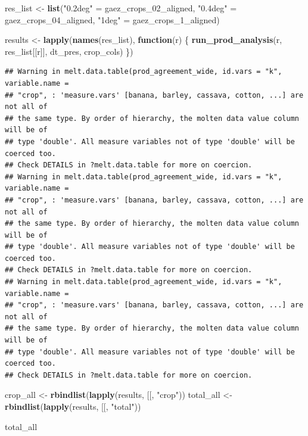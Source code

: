 \documentclass[
  11pt,
]{article}
\newenvironment{Shaded}{\begin{snugshade}}{\end{snugshade}}
\newcommand{\AttributeTok}[1]{\textcolor[rgb]{0.13,0.29,0.53}{#1}}
\newcommand{\ControlFlowTok}[1]{\textcolor[rgb]{0.13,0.29,0.53}{\textbf{#1}}}
\newcommand{\FunctionTok}[1]{\textcolor[rgb]{0.13,0.29,0.53}{\textbf{#1}}}
\newcommand{\NormalTok}[1]{#1}
\newcommand{\OtherTok}[1]{\textcolor[rgb]{0.56,0.35,0.01}{#1}}
\newcommand{\StringTok}[1]{\textcolor[rgb]{0.31,0.60,0.02}{#1}}
\begin{document}
\begin{Shaded}
\begin{Highlighting}[]
\NormalTok{res\_list }\OtherTok{\textless{}{-}} \FunctionTok{list}\NormalTok{(}\StringTok{"0.2deg"} \OtherTok{=}\NormalTok{ gaez\_crops\_02\_aligned,}
                 \StringTok{"0.4deg"} \OtherTok{=}\NormalTok{ gaez\_crops\_04\_aligned,}
                 \StringTok{"1deg"}   \OtherTok{=}\NormalTok{ gaez\_crops\_1\_aligned)}

\NormalTok{results }\OtherTok{\textless{}{-}} \FunctionTok{lapply}\NormalTok{(}\FunctionTok{names}\NormalTok{(res\_list), }\ControlFlowTok{function}\NormalTok{(r) \{}
  \FunctionTok{run\_prod\_analysis}\NormalTok{(r, res\_list[[r]], dt\_pres, crop\_cols)}
\NormalTok{\})}
\end{Highlighting}
\end{Shaded}

\begin{verbatim}
## Warning in melt.data.table(prod_agreement_wide, id.vars = "k", variable.name =
## "crop", : 'measure.vars' [banana, barley, cassava, cotton, ...] are not all of
## the same type. By order of hierarchy, the molten data value column will be of
## type 'double'. All measure variables not of type 'double' will be coerced too.
## Check DETAILS in ?melt.data.table for more on coercion.
## Warning in melt.data.table(prod_agreement_wide, id.vars = "k", variable.name =
## "crop", : 'measure.vars' [banana, barley, cassava, cotton, ...] are not all of
## the same type. By order of hierarchy, the molten data value column will be of
## type 'double'. All measure variables not of type 'double' will be coerced too.
## Check DETAILS in ?melt.data.table for more on coercion.
## Warning in melt.data.table(prod_agreement_wide, id.vars = "k", variable.name =
## "crop", : 'measure.vars' [banana, barley, cassava, cotton, ...] are not all of
## the same type. By order of hierarchy, the molten data value column will be of
## type 'double'. All measure variables not of type 'double' will be coerced too.
## Check DETAILS in ?melt.data.table for more on coercion.
\end{verbatim}

\begin{Shaded}
\begin{Highlighting}[]
\NormalTok{crop\_all  }\OtherTok{\textless{}{-}} \FunctionTok{rbindlist}\NormalTok{(}\FunctionTok{lapply}\NormalTok{(results, }\StringTok{\textasciigrave{}}\AttributeTok{[[}\StringTok{\textasciigrave{}}\NormalTok{, }\StringTok{"crop"}\NormalTok{))}
\NormalTok{total\_all }\OtherTok{\textless{}{-}} \FunctionTok{rbindlist}\NormalTok{(}\FunctionTok{lapply}\NormalTok{(results, }\StringTok{\textasciigrave{}}\AttributeTok{[[}\StringTok{\textasciigrave{}}\NormalTok{, }\StringTok{"total"}\NormalTok{))}

\NormalTok{total\_all}
\end{Highlighting}
\end{Shaded}
\end{document}
